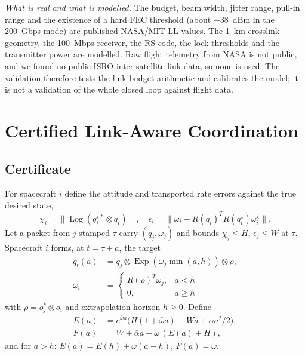 \documentclass[journal]{IEEEtran}
\DeclareMathOperator{\Log}{Log}
\DeclareMathOperator{\Exp}{Exp}
\begin{document}
\emph{What is real and what is modelled.} The budget, beam width, jitter range, pull-in range and the existence of a hard FEC threshold (about $-38$~dBm in the 200~Gbps mode) are published NASA/MIT-LL values. The 1~km crosslink geometry, the 100~Mbps receiver, the RS code, the lock thresholds and the transmitter power are modelled. Raw flight telemetry from NASA is not public, and we found no public ISRO inter-satellite-link data, so none is used. The validation therefore tests the link-budget arithmetic and calibrates the model; it is not a validation of the whole closed loop against flight data.

\section{Certified Link-Aware Coordination}\label{sec:clac}
\subsection{Certificate}
For spacecraft $i$ define the attitude and transported rate errors against the true desired state,
\begin{equation}
\chi_i=\|\Log(q_i^{\star*}\!\otimes q_i)\|,\quad
\epsilon_i=\|\omega_i-R(q_i)^TR(q_i^\star)\omega_i^\star\|.
\end{equation}
Let a packet from $j$ stamped $\tau$ carry $(q_j,\omega_j)$ and bounds $\chi_j\le H$, $\epsilon_j\le W$ at $\tau$. Spacecraft $i$ forms, at $t=\tau+a$, the target
\begin{equation}
\begin{aligned}q_{t}(a)&=q_j\otimes\Exp(\omega_j\min(a,h))\otimes\rho,\\ \omega_{t}&=\begin{cases}R(\rho)^T\omega_j,&a<h\\ 0,&a\ge h\end{cases}\end{aligned}
\end{equation}
with $\rho=o_j^*\otimes o_i$ and extrapolation horizon $h\ge0$. Define
\begin{align}
E(a)&=e^{\bar\omega a}\big(H(1+\bar\omega a)+Wa+\bar\alpha a^2/2\big),\\
F(a)&=W+\bar\alpha a+\bar\omega\,(E(a)+H),
\end{align}
and for $a>h$: $E(a)=E(h)+\bar\omega(a-h)$, $F(a)=\bar\omega$.
\end{document}
